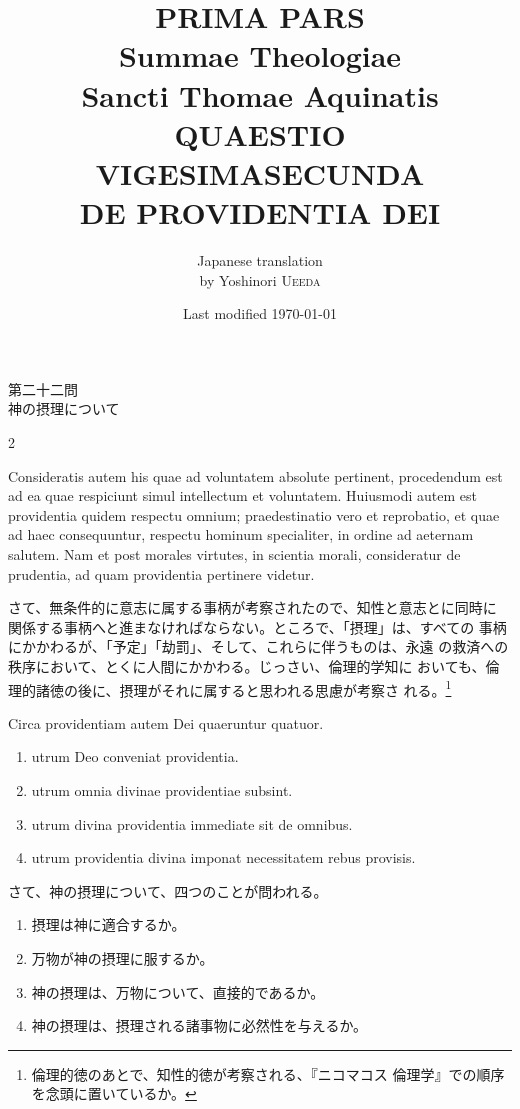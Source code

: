 \documentclass[paper=a4paper,fontsize=10pt,jafontsize=9pt,titlepage]{jlreq}
\title{{\bfseries PRIMA PARS}\\{\Huge Summae Theologiae}\\Sancti Thomae
Aquinatis\\{\sffamily QUAESTIO VIGESIMASECUNDA}\\DE PROVIDENTIA DEI}
\author{Japanese translation\\by Yoshinori {\scshape Ueeda}}
\date{Last modified \today}
\begin{document}
\maketitle
\pagestyle{fancy}

\begin{center}
{\Large 第二十二問\\神の摂理について}
\end{center}


\begin{paracol}{2}

Consideratis autem his quae ad voluntatem absolute pertinent,
 procedendum est ad ea quae respiciunt simul intellectum et
 voluntatem. Huiusmodi autem est providentia quidem respectu omnium;
 praedestinatio vero et reprobatio, et quae ad haec consequuntur,
 respectu hominum specialiter, in ordine ad aeternam salutem. Nam et
 post morales virtutes, in scientia morali, consideratur de prudentia,
 ad quam providentia pertinere videtur.

\switchcolumn

さて、無条件的に意志に属する事柄が考察されたので、知性と意志とに同時に
 関係する事柄へと進まなければならない。ところで、「摂理」は、すべての
 事柄にかかわるが、「予定」「劫罰」、そして、これらに伴うものは、永遠
 の救済への秩序において、とくに人間にかかわる。じっさい、倫理的学知に
 おいても、倫理的諸徳の後に、摂理がそれに属すると思われる思慮が考察さ
 れる。\footnote{倫理的徳のあとで、知性的徳が考察される、『ニコマコス
 倫理学』での順序を念頭に置いているか。}

\switchcolumn*

Circa providentiam autem Dei
 quaeruntur quatuor. 

\begin{enumerate}
 \item utrum Deo conveniat providentia.
 \item utrum omnia divinae providentiae subsint.
 \item utrum divina providentia immediate sit de omnibus.
 \item utrum providentia divina imponat necessitatem rebus provisis.
\end{enumerate}

\switchcolumn

さて、神の摂理について、四つのことが問われる。

\begin{enumerate}
 \item 摂理は神に適合するか。
 \item 万物が神の摂理に服するか。
 \item 神の摂理は、万物について、直接的であるか。
 \item 神の摂理は、摂理される諸事物に必然性を与えるか。
\end{enumerate}

\end{paracol}
\newpage
{}
{}
\setcounter{section}{1}
\setcounter{subsection}{0}
\end{document}
